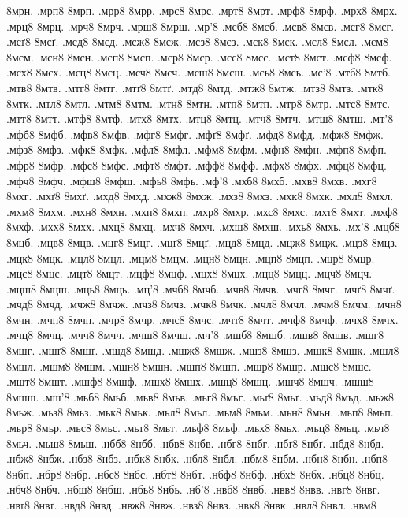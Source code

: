 {8мрн.
.мрп8
8мрп.
.мрр8
8мрр.
.мрс8
8мрс.
.мрт8
8мрт.
.мрф8
8мрф.
.мрх8
8мрх.
.мрц8
8мрц.
.мрч8
8мрч.
.мрш8
8мрш.
.мр'8
.мсб8
8мсб.
.мсв8
8мсв.
.мсг8
8мсг.
.мсґ8
8мсґ.
.мсд8
8мсд.
.мсж8
8мсж.
.мсз8
8мсз.
.мск8
8мск.
.мсл8
8мсл.
.мсм8
8мсм.
.мсн8
8мсн.
.мсп8
8мсп.
.мср8
8мср.
.мсс8
8мсс.
.мст8
8мст.
.мсф8
8мсф.
.мсх8
8мсх.
.мсц8
8мсц.
.мсч8
8мсч.
.мсш8
8мсш.
.мсь8
8мсь.
.мс'8
.мтб8
8мтб.
.мтв8
8мтв.
.мтг8
8мтг.
.мтґ8
8мтґ.
.мтд8
8мтд.
.мтж8
8мтж.
.мтз8
8мтз.
.мтк8
8мтк.
.мтл8
8мтл.
.мтм8
8мтм.
.мтн8
8мтн.
.мтп8
8мтп.
.мтр8
8мтр.
.мтс8
8мтс.
.мтт8
8мтт.
.мтф8
8мтф.
.мтх8
8мтх.
.мтц8
8мтц.
.мтч8
8мтч.
.мтш8
8мтш.
.мт'8
.мфб8
8мфб.
.мфв8
8мфв.
.мфг8
8мфг.
.мфґ8
8мфґ.
.мфд8
8мфд.
.мфж8
8мфж.
.мфз8
8мфз.
.мфк8
8мфк.
.мфл8
8мфл.
.мфм8
8мфм.
.мфн8
8мфн.
.мфп8
8мфп.
.мфр8
8мфр.
.мфс8
8мфс.
.мфт8
8мфт.
.мфф8
8мфф.
.мфх8
8мфх.
.мфц8
8мфц.
.мфч8
8мфч.
.мфш8
8мфш.
.мфь8
8мфь.
.мф'8
.мхб8
8мхб.
.мхв8
8мхв.
.мхг8
8мхг.
.мхґ8
8мхґ.
.мхд8
8мхд.
.мхж8
8мхж.
.мхз8
8мхз.
.мхк8
8мхк.
.мхл8
8мхл.
.мхм8
8мхм.
.мхн8
8мхн.
.мхп8
8мхп.
.мхр8
8мхр.
.мхс8
8мхс.
.мхт8
8мхт.
.мхф8
8мхф.
.мхх8
8мхх.
.мхц8
8мхц.
.мхч8
8мхч.
.мхш8
8мхш.
.мхь8
8мхь.
.мх'8
.мцб8
8мцб.
.мцв8
8мцв.
.мцг8
8мцг.
.мцґ8
8мцґ.
.мцд8
8мцд.
.мцж8
8мцж.
.мцз8
8мцз.
.мцк8
8мцк.
.мцл8
8мцл.
.мцм8
8мцм.
.мцн8
8мцн.
.мцп8
8мцп.
.мцр8
8мцр.
.мцс8
8мцс.
.мцт8
8мцт.
.мцф8
8мцф.
.мцх8
8мцх.
.мцц8
8мцц.
.мцч8
8мцч.
.мцш8
8мцш.
.мць8
8мць.
.мц'8
.мчб8
8мчб.
.мчв8
8мчв.
.мчг8
8мчг.
.мчґ8
8мчґ.
.мчд8
8мчд.
.мчж8
8мчж.
.мчз8
8мчз.
.мчк8
8мчк.
.мчл8
8мчл.
.мчм8
8мчм.
.мчн8
8мчн.
.мчп8
8мчп.
.мчр8
8мчр.
.мчс8
8мчс.
.мчт8
8мчт.
.мчф8
8мчф.
.мчх8
8мчх.
.мчц8
8мчц.
.мчч8
8мчч.
.мчш8
8мчш.
.мч'8
.мшб8
8мшб.
.мшв8
8мшв.
.мшг8
8мшг.
.мшґ8
8мшґ.
.мшд8
8мшд.
.мшж8
8мшж.
.мшз8
8мшз.
.мшк8
8мшк.
.мшл8
8мшл.
.мшм8
8мшм.
.мшн8
8мшн.
.мшп8
8мшп.
.мшр8
8мшр.
.мшс8
8мшс.
.мшт8
8мшт.
.мшф8
8мшф.
.мшх8
8мшх.
.мшц8
8мшц.
.мшч8
8мшч.
.мшш8
8мшш.
.мш'8
.мьб8
8мьб.
.мьв8
8мьв.
.мьг8
8мьг.
.мьґ8
8мьґ.
.мьд8
8мьд.
.мьж8
8мьж.
.мьз8
8мьз.
.мьк8
8мьк.
.мьл8
8мьл.
.мьм8
8мьм.
.мьн8
8мьн.
.мьп8
8мьп.
.мьр8
8мьр.
.мьс8
8мьс.
.мьт8
8мьт.
.мьф8
8мьф.
.мьх8
8мьх.
.мьц8
8мьц.
.мьч8
8мьч.
.мьш8
8мьш.
.нбб8
8нбб.
.нбв8
8нбв.
.нбг8
8нбг.
.нбґ8
8нбґ.
.нбд8
8нбд.
.нбж8
8нбж.
.нбз8
8нбз.
.нбк8
8нбк.
.нбл8
8нбл.
.нбм8
8нбм.
.нбн8
8нбн.
.нбп8
8нбп.
.нбр8
8нбр.
.нбс8
8нбс.
.нбт8
8нбт.
.нбф8
8нбф.
.нбх8
8нбх.
.нбц8
8нбц.
.нбч8
8нбч.
.нбш8
8нбш.
.нбь8
8нбь.
.нб'8
.нвб8
8нвб.
.нвв8
8нвв.
.нвг8
8нвг.
.нвґ8
8нвґ.
.нвд8
8нвд.
.нвж8
8нвж.
.нвз8
8нвз.
.нвк8
8нвк.
.нвл8
8нвл.
.нвм8
}
